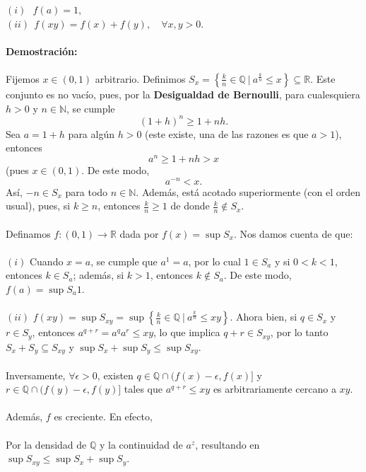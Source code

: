 \documentclass{article}
\begin{document}
\hspace*{1cm} $(i) \ \ \ f(a) = 1,$ \\
\hspace*{1cm} $(ii) \ \ f(xy) = f(x) + f(y), \quad \forall x,y >0.$ \\ \\
\textbf{Demostración:} \\ \\
Fijemos $x \in (0,1)$ arbitrario. Definimos $S_x = \left\{ \frac{k}{n} \in \mathbb{Q} \ | \ a^{\frac{k}{n}} \leq x \right\} \subseteq \mathbb{R}$. Este conjunto es no vacío, pues, por la \textbf{Desigualdad de Bernoulli}, para cualesquiera $h>0$ y $n \in \mathbb{N}$, se cumple \[(1+h)^n \geq 1 + nh.\] Sea $a=1+h$ para algún $h>0$ (este existe, una de las razones es que $a>1$), entonces  \[a^n \geq 1+nh > x\] (pues $x \in (0,1)$. De este modo, \[a^{-n} < x.\]
Así, $-n \in S_x$ para todo $n \in \mathbb{N}$. Además, está acotado superiormente (con el orden usual), pues, si $k\geq n$, entonces $\frac{k}{n} \geq 1$ de donde $\frac{k}{n} \not\in S_x$.  \\ \\
Definamos $f:(0,1) \longrightarrow \mathbb{R}$ dada por $f(x) = \sup S_x$. Nos damos cuenta de que: \\ \\
\hspace{2cm} $(i)$ Cuando $x=a$, se cumple que $a^1 = a$, por lo cual $1 \in S_a$ y si $0<k<1$, entonces $k \in S_a$; además, si $k>1$, entonces $k \not\in S_a$. De este modo, $f(a) = \sup S_a 1$. \\ \\
\hspace{2cm} $(ii)$ $f(xy) = \sup S_{xy} = \sup \left\{ \frac{k}{n} \in \mathbb{Q} \ | \ a^{\frac{k}{n}} \leq xy \right\}$. Ahora bien, si $q \in S_x$ y $r \in S_y$, entonces $a^{q+r} = a^q a^r \leq xy$, lo que implica $q+r \in S_{xy}$, por lo tanto $S_x + S_y \subseteq S_{xy}$ y $\sup S_x + \sup S_y \leq \sup S_{xy}$. \\ \\ Inversamente, $\forall \epsilon > 0$, existen $q \in \mathbb{Q} \cap (f(x)-\epsilon, f(x)]$ y $r \in \mathbb{Q} \cap (f(y)-\epsilon, f(y)]$ tales que $a^{q+r} \leq xy$ es arbitrariamente cercano a $xy$. \\ \\
Además, $f$ es creciente. En efecto, \\ \\
Por la densidad de $\mathbb{Q}$ y la continuidad de $a^z$, resultando en $\sup S_{xy} \leq \sup S_x + \sup S_y$.
\end{document}
